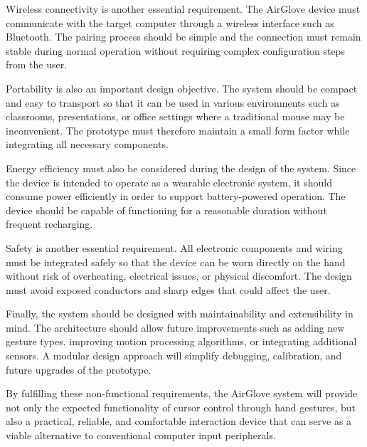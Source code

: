 Wireless connectivity is another essential requirement. The AirGlove device must communicate with the target computer through a wireless interface such as Bluetooth. The pairing process should be simple and the connection must remain stable during normal operation without requiring complex configuration steps from the user.

Portability is also an important design objective. The system should be compact and easy to transport so that it can be used in various environments such as classrooms, presentations, or office settings where a traditional mouse may be inconvenient. The prototype must therefore maintain a small form factor while integrating all necessary components.

Energy efficiency must also be considered during the design of the system. Since the device is intended to operate as a wearable electronic system, it should consume power efficiently in order to support battery-powered operation. The device should be capable of functioning for a reasonable duration without frequent recharging.

Safety is another essential requirement. All electronic components and wiring must be integrated safely so that the device can be worn directly on the hand without risk of overheating, electrical issues, or physical discomfort. The design must avoid exposed conductors and sharp edges that could affect the user.

Finally, the system should be designed with maintainability and extensibility in mind. The architecture should allow future improvements such as adding new gesture types, improving motion processing algorithms, or integrating additional sensors. A modular design approach will simplify debugging, calibration, and future upgrades of the prototype.

By fulfilling these non-functional requirements, the AirGlove system will provide not only the expected functionality of cursor control through hand gestures, but also a practical, reliable, and comfortable interaction device that can serve as a viable alternative to conventional computer input peripherals.




